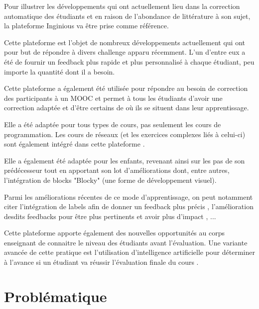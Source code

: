 \documentclass[a4paper]{report}
\begin{document}
Pour illustrer les développements qui ont actuellement lieu dans la correction automatique des étudiants et en raison de l'abondance de littérature à son sujet, la plateforme Inginious va être prise comme référence.

Cette plateforme est l'objet de nombreux développements actuellement qui ont pour but de répondre à divers challenge apparu récemment.
L'un d'entre eux a été de fournir un feedback plus rapide et plus personnalisé à chaque étudiant, peu importe la quantité dont il a besoin\cite{Staubitz2017}.

Cette plateforme a également été utilisée pour répondre au besoin de correction des participants à un MOOC et permet à tous les étudiants d'avoir une correction adaptée et d'être certains de où ils se situent dans leur apprentissage\cite{derval2015automatic}.

Elle a été adaptée pour tous types de cours, pas seulement les cours de programmation.
Les cours de réseaux (et les exercices complexes liés à celui-ci) sont également intégré dans cette plateforme \cite{Bonaventure2020}.

Elle a également été adaptée pour les enfants, revenant ainsi sur les pas de son prédécesseur tout en apportant son lot d'améliorations \cite{Thuin} dont, entre autres, l'intégration de blocks "Blocky" (une forme de développement visuel).

Parmi les améliorations récentes de ce mode d'apprentissage, on peut notamment citer l'intégration de labels afin de donner un feedback plus précis \cite{Martin}, l'amélioration desdits feedbacks pour être plus pertinents et avoir plus d'impact \cite{Derval2022}, ...

Cette plateforme apporte également des nouvelles opportunités au corps enseignant de connaitre le niveau des étudiants avant l'évaluation.
Une variante avancée de cette pratique est l'utilisation d'intelligence artificielle pour déterminer à l'avance si un étudiant va réussir l'évaluation finale du cours \cite{Hormaux}.


\chapter{Problématique}
\end{document}
